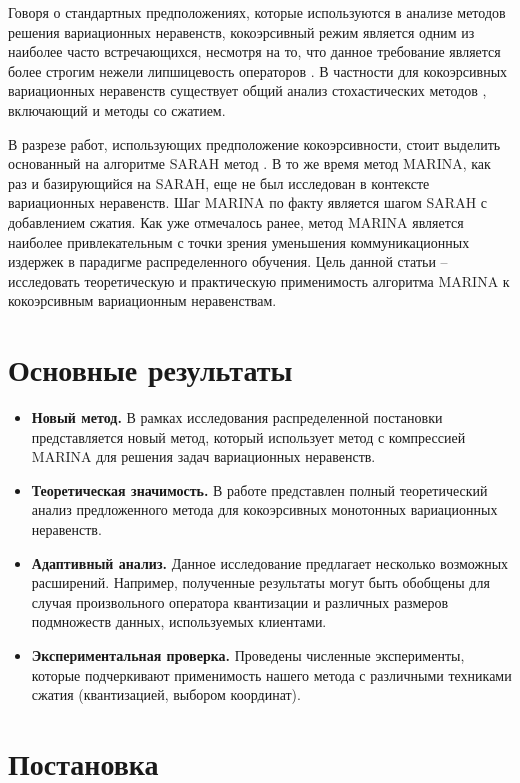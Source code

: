 \documentclass{ProcISPRAS}
\begin{document}
Говоря о стандартных предположениях, которые используются в анализе методов решения вариационных неравенств, кокоэрсивный режим является одним из наиболее часто встречающихся, несмотря на то, что данное требование является более строгим нежели липшицевость операторов \cite{loizou2021stochastic}. В частности для кокоэрсивных вариационных неравенств существует общий анализ стохастических методов \cite{beznosikov2023stochastic}, включающий и методы со сжатием.

В разрезе работ, использующих предположение кокоэрсивности, стоит выделить основанный на алгоритме \textsc{SARAH} метод \cite{beznosikov2023sarah}. В то же время метод \textsc{MARINA}, как раз и базирующийся на \textsc{SARAH}, еще не был исследован в контексте вариационных неравенств. Шаг \textsc{MARINA} по факту является шагом \textsc{SARAH} с добавлением сжатия. Как уже отмечалось ранее, метод \textsc{MARINA} является наиболее привлекательным с точки зрения уменьшения коммуникационных издержек в парадигме распределенного обучения. Цель данной статьи -- исследовать теоретическую и практическую применимость алгоритма \textsc{MARINA} к кокоэрсивным вариационным неравенствам.

\section{Основные результаты}
\begin{itemize}
\item \textbf{Новый метод.} В рамках исследования распределенной постановки представляется новый метод, который использует метод с компрессией \textsc{MARINA} для решения задач вариационных неравенств. 
\item {\bfseries Теоретическая значимость.} В работе представлен полный теоретический анализ предложенного метода для кокоэрсивных монотонных вариационных неравенств.
\item \textbf{Адаптивный анализ.} Данное исследование предлагает несколько возможных расширений. Например, полученные результаты могут быть обобщены для случая произвольного оператора квантизации и различных размеров подмножеств данных, используемых клиентами.
\item \textbf{Экспериментальная проверка.} Проведены численные эксперименты, которые подчеркивают применимость нашего метода с различными техниками сжатия (квантизацией, выбором координат).
\end{itemize}



\section{Постановка}
\end{document}

